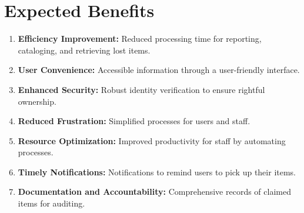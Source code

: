 \section{Expected Benefits}
\begin{enumerate}
    \item \textbf{Efficiency Improvement:} Reduced processing time for reporting, cataloging, and retrieving lost items.
    \item \textbf{User Convenience:} Accessible information through a user-friendly interface.
    \item \textbf{Enhanced Security:} Robust identity verification to ensure rightful ownership.
    \item \textbf{Reduced Frustration:} Simplified processes for users and staff.
    \item \textbf{Resource Optimization:} Improved productivity for staff by automating processes.
    \item \textbf{Timely Notifications:} Notifications to remind users to pick up their items.
    \item \textbf{Documentation and Accountability:} Comprehensive records of claimed items for auditing.
\end{enumerate}

